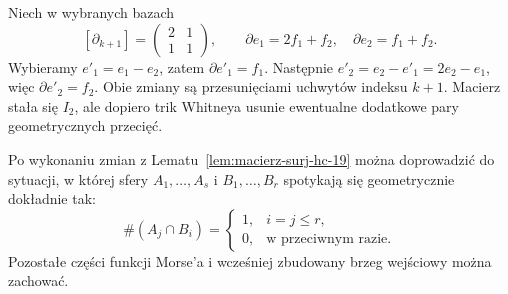 \begin{przyklad}
Niech w wybranych bazach
\[
 [\partial_{k+1}]
 =\begin{pmatrix}2&1\\1&1\end{pmatrix},
 \qquad
 \partial e_1=2f_1+f_2,\quad
 \partial e_2=f_1+f_2.
\]
Wybieramy
$e'_1=e_1-e_2$, zatem
$\partial e'_1=f_1$.
Następnie
$e'_2=e_2-e'_1=2e_2-e_1$,
więc $\partial e'_2=f_2$.
Obie zmiany są przesunięciami
uchwytów indeksu $k+1$.
Macierz stała się $I_2$,
ale dopiero trik Whitneya
usunie ewentualne
dodatkowe pary
geometrycznych przecięć.
\end{przyklad}

\begin{stwierdzenie}
\label{prop:realizacja-hc-19}
Po wykonaniu zmian z
Lematu~\ref{lem:macierz-surj-hc-19}
można doprowadzić do sytuacji,
w której sfery
$A_1,\ldots,A_s$ i
$B_1,\ldots,B_r$
spotykają się geometrycznie
dokładnie tak:
\[
 \#(A_j\cap B_i)=
 \begin{cases}
  1,& i=j\leq r,\\
  0,& \text{w przeciwnym razie}.
 \end{cases}
\]
Pozostałe części funkcji Morse'a
i wcześniej zbudowany brzeg
wejściowy można zachować.
\end{stwierdzenie}
